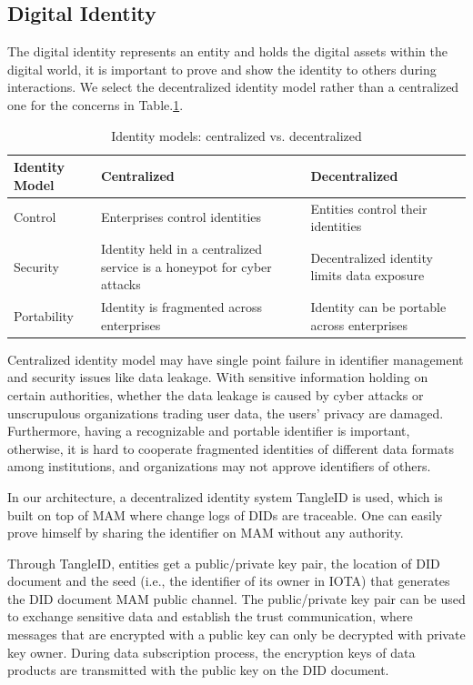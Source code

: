 \documentclass[conference]{IEEEtran}
\begin{document}
\subsection{Digital Identity}
The digital identity represents an entity and holds the digital assets within the digital world, it is important to prove and show the identity to others during interactions. We select the decentralized identity model rather than a centralized one for the concerns in Table.\ref{tab:did}.
\begin{table}[h]
	\caption{Identity models: centralized vs. decentralized}
	\label{tab:did}
	\begin{tabularx}{\linewidth}{|l|X|X|}
	\hline
		\textbf{Identity Model} & \textbf{Centralized} & \textbf{Decentralized} \\
		\hline
		Control & Enterprises control identities & Entities control their identities \\
		\hline
		Security & Identity held in a centralized service is a honeypot for cyber attacks & Decentralized identity limits data exposure \\
		\hline
		Portability & Identity is fragmented across enterprises & Identity can be portable across enterprises \\
		\hline
	\end{tabularx}
\end{table}

Centralized identity model may have single point failure in identifier management and security issues like data leakage. With sensitive information holding on certain authorities, whether the data leakage is caused by cyber attacks or unscrupulous organizations trading user data, the users' privacy are damaged. Furthermore, having a recognizable and portable identifier is important, otherwise, it is hard to cooperate fragmented identities of different data formats among institutions, and organizations may not approve identifiers of others.

In our architecture, a decentralized identity system TangleID\cite{TangleID} is used, which is built on top of MAM where change logs of DIDs are traceable. One can easily prove himself by sharing the identifier on MAM without any authority.

Through TangleID, entities get a public/private key pair, the location of DID document and the seed (i.e., the identifier of its owner in IOTA) that generates the DID document MAM public channel. The public/private key pair can be used to exchange sensitive data and establish the trust communication, where messages that are encrypted with a public key can only be decrypted with private key owner. During data subscription process, the encryption keys of data products are transmitted with the public key on the DID document.
\end{document}
